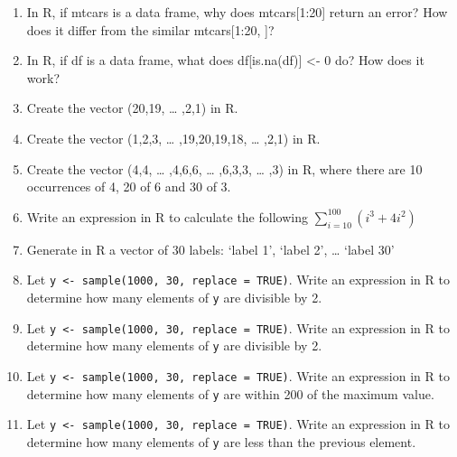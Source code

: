 \documentclass[
]{article}
\begin{document}
\vspace{0px}

\begin{enumerate}
\def\labelenumi{\arabic{enumi}.}
\setcounter{enumi}{56}
\item
  In R, if mtcars is a data frame, why does mtcars{[}1:20{]} return an
  error? How does it differ from the similar mtcars{[}1:20, {]}?
  \vspace{0px}
\item
  In R, if df is a data frame, what does df{[}is.na(df){]} \textless- 0
  do? How does it work? \vspace{0px}
\item
  Create the vector (20,19, \ldots{} ,2,1) in R. \vspace{0px}
\item
  Create the vector (1,2,3, \ldots{} ,19,20,19,18, \ldots{} ,2,1) in R.
  \vspace{0px}
\item
  Create the vector (4,4, \ldots{} ,4,6,6, \ldots{} ,6,3,3, \ldots{} ,3)
  in R, where there are 10 occurrences of 4, 20 of 6 and 30 of 3.
  \vspace{0px}
\item
  Write an expression in R to calculate the following
  \(\sum_{i=10}^{100} (i^3 + 4i^2)\) \vspace{0px}
\item
  Generate in R a vector of 30 labels: `label 1', `label 2', \ldots{}
  `label 30' \vspace{0px}
\item
  Let \texttt{y\ \textless{}-\ sample(1000,\ 30,\ replace\ =\ TRUE)}.
  Write an expression in R to determine how many elements of \texttt{y}
  are divisible by 2. \vspace{0px}
\item
  Let \texttt{y\ \textless{}-\ sample(1000,\ 30,\ replace\ =\ TRUE)}.
  Write an expression in R to determine how many elements of \texttt{y}
  are divisible by 2. \vspace{0px}
\item
  Let \texttt{y\ \textless{}-\ sample(1000,\ 30,\ replace\ =\ TRUE)}.
  Write an expression in R to determine how many elements of \texttt{y}
  are within 200 of the maximum value. \vspace{0px}
\item
  Let \texttt{y\ \textless{}-\ sample(1000,\ 30,\ replace\ =\ TRUE)}.
  Write an expression in R to determine how many elements of \texttt{y}
  are less than the previous element. \vspace{0px}

\end{enumerate}
\end{document}
